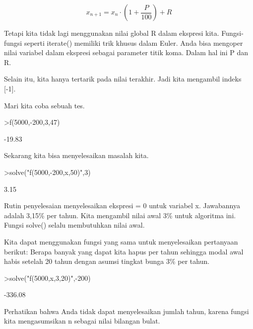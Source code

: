 \documentclass[a4paper,10pt]{article}
\begin{document}
\begin{eulernotebook}
\begin{eulercomment}
\begin{eulercomment}
\begin{eulercomment}
\begin{eulercomment}
\begin{eulercomment}
\begin{eulercomment}
\begin{eulercomment}
\begin{eulercomment}
\begin{eulercomment}
\end{eulercomment}
\begin{eulerformula}
\[
x_{n+1} = x_n \cdot \left(1+ \frac{P}{100}\right) + R
\]
\end{eulerformula}
\begin{eulercomment}
Tetapi kita tidak lagi menggunakan nilai global R dalam ekspresi kita.
Fungsi-fungsi seperti iterate() memiliki trik khusus dalam Euler. Anda
bisa mengoper nilai variabel dalam ekspresi sebagai parameter titik
koma. Dalam hal ini P dan R.

Selain itu, kita hanya tertarik pada nilai terakhir. Jadi kita
mengambil indeks [-1].

Mari kita coba sebuah tes.
\end{eulercomment}
\begin{eulerprompt}
>f(5000,-200,3,47)
\end{eulerprompt}
\begin{euleroutput}
       -19.83 
\end{euleroutput}
\begin{eulercomment}
Sekarang kita bisa menyelesaikan masalah kita.
\end{eulercomment}
\begin{eulerprompt}
>solve("f(5000,-200,x,50)",3)
\end{eulerprompt}
\begin{euleroutput}
         3.15 
\end{euleroutput}
\begin{eulercomment}
Rutin penyelesaian menyelesaikan ekspresi = 0 untuk variabel x.
Jawabannya adalah 3,15\% per tahun. Kita mengambil nilai awal 3\% untuk
algoritma ini. Fungsi solve() selalu membutuhkan nilai awal.

Kita dapat menggunakan fungsi yang sama untuk menyelesaikan pertanyaan
berikut: Berapa banyak yang dapat kita hapus per tahun sehingga modal
awal habis setelah 20 tahun dengan asumsi tingkat bunga 3\% per tahun.
\end{eulercomment}
\begin{eulerprompt}
>solve("f(5000,x,3,20)",-200)
\end{eulerprompt}
\begin{euleroutput}
      -336.08 
\end{euleroutput}
\begin{eulercomment}
Perhatikan bahwa Anda tidak dapat menyelesaikan jumlah tahun, karena
fungsi kita mengasumsikan n sebagai nilai bilangan bulat.


\end{eulercomment}
\end{eulercomment}
\end{eulercomment}
\end{eulercomment}
\end{eulercomment}
\end{eulercomment}
\end{eulercomment}
\end{eulercomment}
\end{eulercomment}
\end{eulernotebook}
\end{document}
